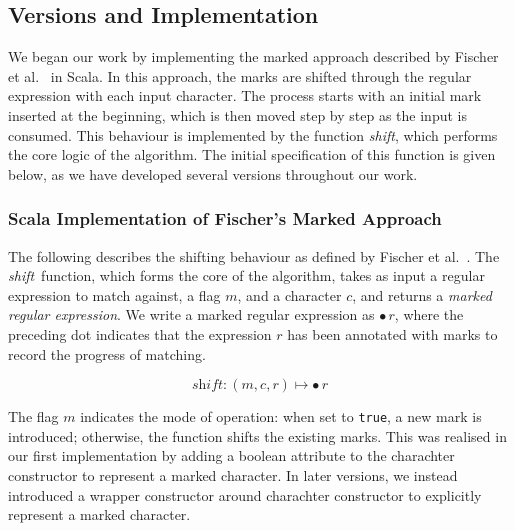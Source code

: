 \documentclass[12pt]{article}
\newcommand{\shift}{\textit{shift}}
\newcommand{\Marked}[1]{\bullet\,#1}
\begin{document}
\subsection{Versions and Implementation}

We began our work by implementing the marked approach described by Fischer et al.~\cite{Fischer2010} in Scala. 
In this approach, the marks are shifted through the regular expression with each input character. 
The process starts with an initial mark inserted at the beginning, which is then moved step by step as the input is consumed. 
This behaviour is implemented by the function \shift, which performs the core logic of the algorithm. 
The initial specification of this function is given below, as we have developed several versions throughout our work.

\subsubsection*{Scala Implementation of Fischer’s Marked Approach}

The following describes the shifting behaviour as defined by Fischer et al.~\cite{Fischer2010}. 
The \shift\ function, which forms the core of the algorithm, takes as input a regular expression to match against, 
a flag $m$, and a character $c$, and returns a \emph{marked regular expression}. 
We write a marked regular expression as $\bullet\,r$, where the preceding dot indicates that the expression $r$ 
has been annotated with marks to record the progress of matching.  

\[
  \shift : (m, c, r) \mapsto \Marked{r}
\]  

The flag $m$ indicates the mode of operation: when set to \texttt{true}, a new mark is introduced; 
otherwise, the function shifts the existing marks. This was realised in our first implementation 
by adding a boolean attribute to the charachter constructor to represent a marked character. In 
later versions, we instead introduced a wrapper constructor around charachter constructor to 
explicitly represent a marked character.
\end{document}
